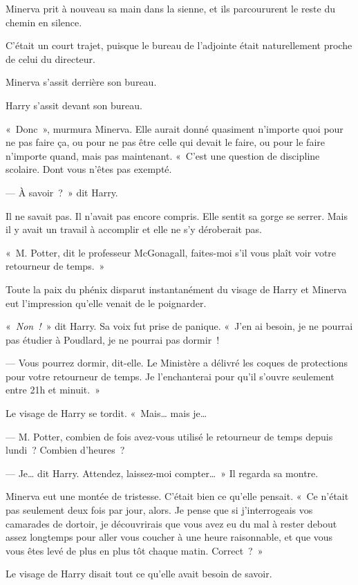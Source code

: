Minerva prit à nouveau sa main dans la sienne, et ils parcoururent le reste du chemin en silence.

C'était un court trajet, puisque le bureau de l'adjointe était naturellement proche de celui du directeur.

Minerva s'assit derrière son bureau.

Harry s'assit devant son bureau.

«~Donc~», murmura Minerva.
Elle aurait donné quasiment n'importe quoi pour ne pas faire ça, ou pour ne pas être celle qui devait le faire, ou pour le faire n'importe quand, mais pas maintenant.
«~C'est une question de discipline scolaire.
Dont vous n'êtes pas exempté.

--- À savoir~?~»
dit Harry.

Il ne savait pas.
Il n'avait pas encore compris.
Elle sentit sa gorge se serrer.
Mais il y avait un travail à accomplir et elle ne s'y déroberait pas.

«~M. Potter, dit le professeur McGonagall, faites-moi s'il vous plaît voir votre retourneur de temps.~»

Toute la paix du phénix disparut instantanément du visage de Harry et Minerva eut l'impression qu'elle venait de le poignarder.

«~\emph{Non~!}~» dit Harry.
Sa voix fut prise de panique.
«~J'en ai besoin, je ne pourrai pas étudier à Poudlard, je ne pourrai pas dormir~!

--- Vous pourrez dormir, dit-elle.
Le Ministère a délivré les coques de protections pour votre retourneur de temps.
Je l'enchanterai pour qu'il s'ouvre seulement entre 21h et minuit.~»

Le visage de Harry se tordit.
«~Mais… mais je…

--- M. Potter, combien de fois avez-vous utilisé le retourneur de temps depuis lundi~?
Combien d'heures~?

--- Je… dit Harry.
Attendez, laissez-moi compter…~»
Il regarda sa montre.

Minerva eut une montée de tristesse.
C'était bien ce qu'elle pensait.
«~Ce n'était pas seulement deux fois par jour, alors.
Je pense que si j'interrogeais vos camarades de dortoir, je découvrirais que vous avez eu du mal à rester debout assez longtemps pour aller vous coucher à une heure raisonnable, et que vous vous êtes levé de plus en plus tôt chaque matin.
Correct~?~»

Le visage de Harry disait tout ce qu'elle avait besoin de savoir.

